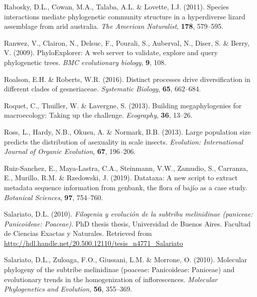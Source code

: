 \documentclass[]{article}
\begin{document}
\leavevmode\hypertarget{ref-rabosky2011species}{}%
Rabosky, D.L., Cowan, M.A., Talaba, A.L. \& Lovette, I.J. (2011). Species interactions mediate phylogenetic community structure in a hyperdiverse lizard assemblage from arid australia. \emph{The American Naturalist}, \textbf{178}, 579--595.

\leavevmode\hypertarget{ref-ranwez2009phyloexplorer}{}%
Ranwez, V., Clairon, N., Delsuc, F., Pourali, S., Auberval, N., Diser, S. \& Berry, V. (2009). PhyloExplorer: A web server to validate, explore and query phylogenetic trees. \emph{BMC evolutionary biology}, \textbf{9}, 108.

\leavevmode\hypertarget{ref-roalson2016distinct}{}%
Roalson, E.H. \& Roberts, W.R. (2016). Distinct processes drive diversification in different clades of gesneriaceae. \emph{Systematic Biology}, \textbf{65}, 662--684.

\leavevmode\hypertarget{ref-roquet2013building}{}%
Roquet, C., Thuiller, W. \& Lavergne, S. (2013). Building megaphylogenies for macroecology: Taking up the challenge. \emph{Ecography}, \textbf{36}, 13--26.

\leavevmode\hypertarget{ref-ross2013large}{}%
Ross, L., Hardy, N.B., Okusu, A. \& Normark, B.B. (2013). Large population size predicts the distribution of asexuality in scale insects. \emph{Evolution: International Journal of Organic Evolution}, \textbf{67}, 196--206.

\leavevmode\hypertarget{ref-ruiz2019datataxa}{}%
Ruiz-Sanchez, E., Maya-Lastra, C.A., Steinmann, V.W., Zamudio, S., Carranza, E., Murillo, R.M. \& Rzedowski, J. (2019). Datataxa: A new script to extract metadata sequence information from genbank, the flora of bajío as a case study. \emph{Botanical Sciences}, \textbf{97}, 754--760.

\leavevmode\hypertarget{ref-salariato2010filogenia}{}%
Salariato, D.L. (2010). \emph{Filogenia y evolución de la subtribu melinidinae (paniceae: Panicoideae: Poaceae)}. PhD thesis thesis, Universidad de Buenos Aires. Facultad de Ciencias Exactas y Naturales. Retrieved from \url{http://hdl.handle.net/20.500.12110/tesis_n4771_Salariato}

\leavevmode\hypertarget{ref-salariato2010molecular}{}%
Salariato, D.L., Zuloaga, F.O., Giussani, L.M. \& Morrone, O. (2010). Molecular phylogeny of the subtribe melinidinae (poaceae: Panicoideae: Paniceae) and evolutionary trends in the homogenization of inflorescences. \emph{Molecular Phylogenetics and Evolution}, \textbf{56}, 355--369.
\end{document}
